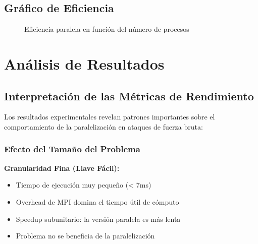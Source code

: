 \documentclass[12pt,letterpaper]{article}
\begin{document}
\subsection{Gráfico de Eficiencia}

\begin{figure}[H]
\centering
{}
\caption{Eficiencia paralela en función del número de procesos}
\label{fig:eficiencia}
\end{figure}

\section{Análisis de Resultados}

\subsection{Interpretación de las Métricas de Rendimiento}

Los resultados experimentales revelan patrones importantes sobre el comportamiento de la paralelización en ataques de fuerza bruta:

\subsubsection{Efecto del Tamaño del Problema}

\textbf{Granularidad Fina (Llave Fácil):}
\begin{itemize}
    \item Tiempo de ejecución muy pequeño (< 7ms)
    \item Overhead de MPI domina el tiempo útil de cómputo
    \item Speedup subunitario: la versión paralela es más lenta
    \item Problema no se beneficia de la paralelización
\end{itemize}
\end{document}
